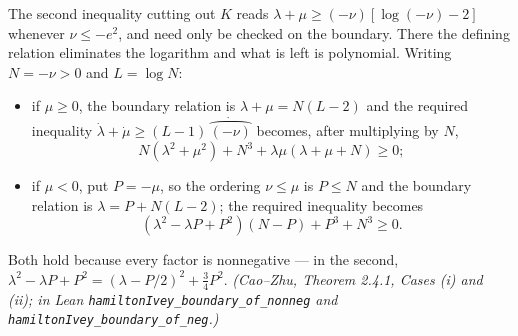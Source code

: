 \begin{lemma}
  \label{lem:ivey-boundary}
  \leanok
  The second inequality cutting out $K$ reads
  $\lambda+\mu \ge (-\nu)[\log(-\nu)-2]$ whenever $\nu \le -e^2$, and need only
  be checked on the boundary. There the defining relation eliminates the
  logarithm and what is left is polynomial. Writing $N = -\nu > 0$ and
  $L = \log N$:
  \begin{itemize}
    \item if $\mu \ge 0$, the boundary relation is $\lambda + \mu = N(L-2)$ and
      the required inequality
      $\dot\lambda + \dot\mu \ge (L-1)\,\dot{\overparen{(-\nu)}}$ becomes,
      after multiplying by $N$,
      \[
        N(\lambda^2+\mu^2) + N^3 + \lambda\mu(\lambda+\mu+N) \ge 0 ;
      \]
    \item if $\mu < 0$, put $P = -\mu$, so the ordering $\nu \le \mu$ is
      $P \le N$ and the boundary relation is $\lambda = P + N(L-2)$; the
      required inequality becomes
      \[
        (\lambda^2 - \lambda P + P^2)(N - P) + P^3 + N^3 \ge 0 .
      \]
  \end{itemize}
  Both hold because every factor is nonnegative --- in the second,
  $\lambda^2-\lambda P+P^2 = (\lambda - P/2)^2 + \tfrac34 P^2$.
  \emph{(Cao--Zhu, Theorem 2.4.1, Cases (i) and (ii); in Lean
  \texttt{hamiltonIvey\_boundary\_of\_nonneg} and
  \texttt{hamiltonIvey\_boundary\_of\_neg}.)}
\end{lemma}

